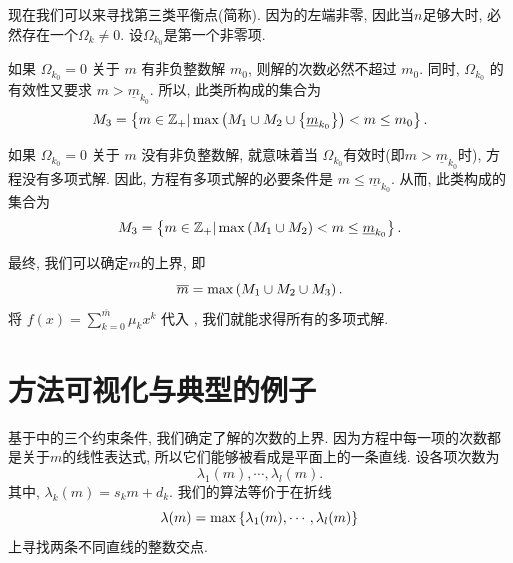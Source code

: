 现在我们可以来寻找第三类平衡点(简称\BPthree{}). 因为的左端非零, 因此当$n$足够大时, 必然存在一个$\Omega_k\neq 0$. 设$\Omega_{k_0}$是第一个非零项. 

如果 $\Omega_{k_0}=0$ 关于 $m$ 有非负整数解 $m_0$, 则解的次数必然不超过 $m_0$. 同时, $\Omega_{k_0}$ 的有效性又要求 $m>\underline{m}_{k_0}$. 所以, 此类\BPthree{}所构成的集合为 
\begin{equation}
M_3=\left\{m\in \mathbb Z_+|\max\left(M_1\cup M_2 \cup \left\{\underline{m}_{k_0}\right\}\right)<m\le m_0\right\}. \label{BP31}
\end{equation}

如果 $\Omega_{k_0}=0$ 关于 $m$ 没有非负整数解, 就意味着当 $\Omega_{k_0}$有效时(即$m>\underline{m}_{k_0}$时), 方程没有多项式解. 因此, 方程有多项式解的必要条件是 $m\le \underline{m}_{k_0}$. 从而, 此类\BPthree{}构成的集合为 
\begin{equation}
M_3=\left\{m\in \mathbb Z_+|\max\left(M_1\cup M_2\right)<m\le \underline{m}_{k_0}\right\}. \label{BP32}
\end{equation}

最终, 我们可以确定$m$的上界, 即
\begin{equation}
\overline m =\max\left(M_1\cup M_2\cup M_3\right).
\end{equation}
将 $f(x)=\sum_{k=0}^{\overline m}{\mu_k x^k}$ 代入 , 我们就能求得所有的多项式解.

\section{方法可视化与典型的例子}\label{ch4sec2}
基于中的三个约束条件, 我们确定了解的次数的上界. 因为方程中每一项的次数都是关于$m$的线性表达式, 所以它们能够被看成是平面上的一条直线. 设各项次数为 
\begin{equation}
\lambda_1(m),\cdots,\lambda_l(m). \label{lines}
\end{equation}
其中, $\lambda_k(m)=s_k m+d_k$. 我们的算法等价于在折线
\begin{equation}
\lambda(m)=\max\left\{\lambda_1(m),\cdots,\lambda_l(m)\right\} \label{broken_line}
\end{equation}
上寻找两条不同直线的整数交点. 

